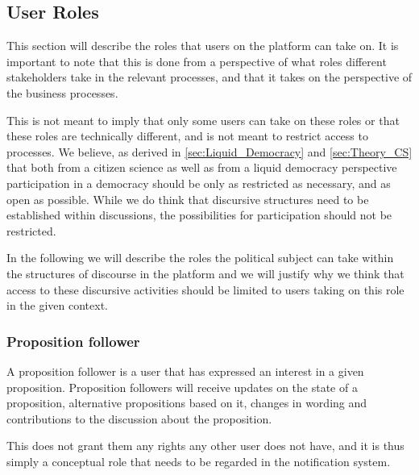 \subsection{User Roles}
\label{sec:UserRoles}
This section will describe the roles that users on the platform can take on.
It is important to note that this is done from a perspective of what roles different stakeholders take in the relevant processes, and that it takes on the perspective of the business processes.

This is not meant to imply that only some users can take on these roles or that these roles are technically different, and is not meant to restrict access to processes.
We believe, as derived in \ref{sec:Liquid_Democracy} and \ref{sec:Theory_CS} that both from a citizen science as well as from a liquid democracy perspective participation in a democracy should be only as restricted as necessary, and as open as possible.
While we do think that discursive structures need to be established within discussions, the possibilities for participation should not be restricted.

In the following we will describe the roles the political subject can take within the structures of discourse in the platform and we will justify why we think that access to these discursive activities should be limited to users taking on this role in the given context.

\subsubsection{Proposition follower}
A proposition follower is a user that has expressed an interest in a given proposition. Proposition followers will receive updates on the state of a proposition, alternative propositions based on it, changes in wording and contributions to the discussion about the proposition.

This does not grant them any rights any other user does not have, and it is thus simply a conceptual role that needs to be regarded in the notification system.

